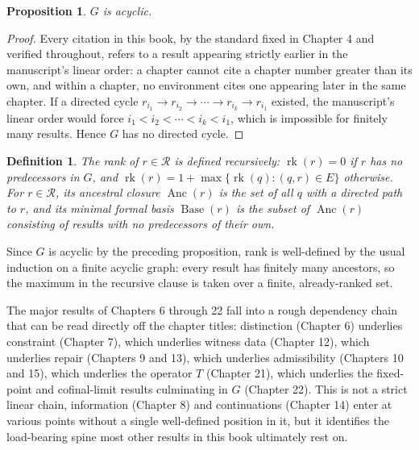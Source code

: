 \documentclass[11pt]{book}
\newtheorem*{appendixdefinition}{Definition}
\newtheorem*{appendixproposition}{Proposition}
\begin{document}
\begin{appendixproposition}
$G$ is acyclic.
\end{appendixproposition}

\begin{proof}
Every citation in this book, by the standard fixed in Chapter 4 and verified throughout, refers to a result appearing strictly earlier in the manuscript's linear order: a chapter cannot cite a chapter number greater than its own, and within a chapter, no environment cites one appearing later in the same chapter. If a directed cycle $r_{i_1} \to r_{i_2} \to \cdots \to r_{i_k} \to r_{i_1}$ existed, the manuscript's linear order would force $i_1 < i_2 < \cdots < i_k < i_1$, which is impossible for finitely many results. Hence $G$ has no directed cycle.
\end{proof}

\begin{appendixdefinition}
The \emph{rank} of $r \in \mathcal R$ is defined recursively: $\operatorname{rk}(r) = 0$ if $r$ has no predecessors in $G$, and $\operatorname{rk}(r) = 1 + \max\{\operatorname{rk}(q) : (q,r) \in E\}$ otherwise. For $r \in \mathcal R$, its \emph{ancestral closure} $\operatorname{Anc}(r)$ is the set of all $q$ with a directed path to $r$, and its \emph{minimal formal basis} $\operatorname{Base}(r)$ is the subset of $\operatorname{Anc}(r)$ consisting of results with no predecessors of their own.
\end{appendixdefinition}

Since $G$ is acyclic by the preceding proposition, rank is well-defined by the usual induction on a finite acyclic graph: every result has finitely many ancestors, so the maximum in the recursive clause is taken over a finite, already-ranked set.

The major results of Chapters 6 through 22 fall into a rough dependency chain that can be read directly off the chapter titles: distinction (Chapter 6) underlies constraint (Chapter 7), which underlies witness data (Chapter 12), which underlies repair (Chapters 9 and 13), which underlies admissibility (Chapters 10 and 15), which underlies the operator $T$ (Chapter 21), which underlies the fixed-point and cofinal-limit results culminating in $G$ (Chapter 22). This is not a strict linear chain, information (Chapter 8) and continuations (Chapter 14) enter at various points without a single well-defined position in it, but it identifies the load-bearing spine most other results in this book ultimately rest on.
\end{document}

